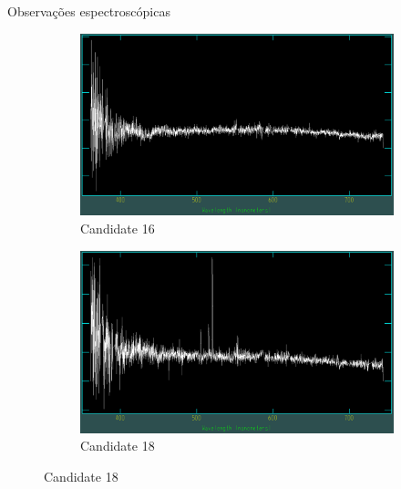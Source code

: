 \begin{frame}[c]{Observações espectroscópicas}
\begin{figure}
    \captionsetup{justification=centering}
    \centering
    \begin{subfigure}[b]{0.31\textwidth}
        \includegraphics[width=\textwidth]{images/espectros/UCG16.png}
        \caption{Candidate 16}
    \end{subfigure}
    \begin{subfigure}[b]{0.31\textwidth}
        \includegraphics[width=\textwidth]{images/espectros/UCG18.png}
        \caption{Candidate 18}
    \end{subfigure}
\end{figure}
\end{frame}

